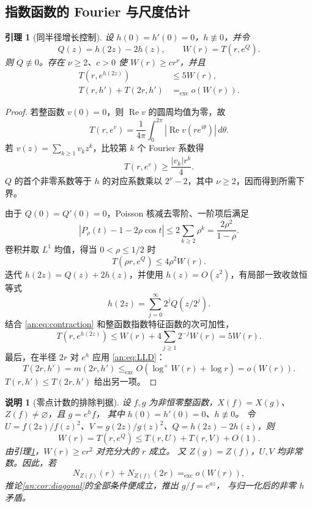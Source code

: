 \documentclass[11pt,a4paper,oneside,openany]{book}
\theoremstyle{lecture}
\newtheorem{lemma}[theorem]{引理}
\newtheorem{remark}[theorem]{说明}
\newcommand{\excle}{\mathrel{\le_{\mathrm{exc}}}}
\newcommand{\exceq}{\mathrel{=_{\mathrm{exc}}}}
\numberwithin{equation}{section}
\begin{document}
\subsection{指数函数的 Fourier 与尺度估计}
\begin{lemma}[同半径增长控制]\label{an:lem:scale}
设 $h(0)=h'(0)=0$，$h\not\equiv0$，并令
\[
 Q(z)=h(2z)-2h(z),\qquad W(r)=T(r,e^Q).
\]
则 $Q\not\equiv0$。存在 $\nu\ge2$、$c>0$ 使 $W(r)\ge cr^\nu$，并且
\begin{align}
 T(r,e^{h(2z)})&\le5W(r),\label{an:eq:scaleT}\\
 T(r,h')+T(2r,h')&\exceq o(W(r)).\label{an:eq:scaledderivative}
\end{align}
\end{lemma}
\begin{proof}
若整函数 $v(0)=0$，则 $\operatorname{Re}v$ 的圆周均值为零，故
\[
 T(r,e^v)=\frac1{4\pi}\int_0^{2\pi}|\operatorname{Re}v(re^{i\theta})|\,d\theta.
\]
若 $v(z)=\sum_{k\ge1}v_kz^k$，比较第 $k$ 个 Fourier 系数得
\begin{equation}\label{an:eq:fourierlower}
 T(r,e^v)\ge\frac{|v_k|r^k}{4}.
\end{equation}
$Q$ 的首个非零系数等于 $h$ 的对应系数乘以 $2^\nu-2$，其中 $\nu\ge2$，因而得到所需下界。

由于 $Q(0)=Q'(0)=0$，Poisson 核减去零阶、一阶项后满足
\[
 \left|P_\rho(t)-1-2\rho\cos t\right|
 \le2\sum_{k\ge2}\rho^k=\frac{2\rho^2}{1-\rho}.
\]
卷积并取 $L^1$ 均值，得当 $0<\rho\le1/2$ 时
\begin{equation}\label{an:eq:contraction}
 T(\rho r,e^Q)\le4\rho^2W(r).
\end{equation}
迭代 $h(2z)=Q(z)+2h(z)$，并使用 $h(z)=O(z^2)$，有局部一致收敛恒等式
\[
 h(2z)=\sum_{j=0}^{\infty}2^jQ(z/2^j).
\]
结合 \eqref{an:eq:contraction} 和整函数指数特征函数的次可加性，
\[
 T(r,e^{h(2z)})
 \le W(r)+4\sum_{j\ge1}2^{-j}W(r)=5W(r).
\]
最后，在半径 $2r$ 对 $e^h$ 应用 \eqref{an:eq:LLD}：
\[
 T(2r,h')=m(2r,h')\excle O(\log^+W(r)+\log r)=o(W(r)).
\]
$T(r,h')\le T(2r,h')$ 给出另一项。
\end{proof}

\begin{remark}[零点计数的排除判据]\label{an:rem:sparse-use}
设 $f,g$ 为非恒零整函数，$X(f)=X(g)$、$Z(f)\ne\varnothing$，且 $g=e^hf$，
其中 $h(0)=h'(0)=0$、$h\not\equiv0$。
令 $U=f(2z)/f(z)^2$、$V=g(2z)/g(z)^2$、$Q=h(2z)-2h(z)$，则
\[
 W(r)=T(r,e^Q)\le T(r,U)+T(r,V)+O(1).
\]
由引理\ref{an:lem:scale}，$W(r)\ge cr^2$ 对充分大的 $r$ 成立。
又 $Z(g)=Z(f)$，$U,V$ 均非常数。因此，若
\[
 N_{Z(f)}(r)+N_{Z(f)}(2r)\exceq o(W(r)),
\]
推论\ref{an:cor:diagonal}的全部条件便成立，推出 $g/f=e^{az}$，
与归一化后的非零 $h$ 矛盾。
\end{remark}
\end{document}
